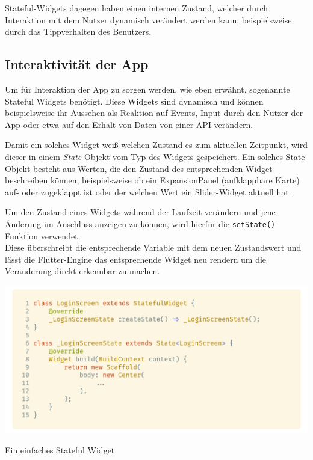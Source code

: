Stateful-Widgets dagegen haben einen internen Zustand, welcher durch Interaktion mit dem Nutzer dynamisch verändert
werden kann, beispielsweise durch das Tippverhalten des Benutzers.

\subsection{Interaktivität der App}


Um für Interaktion der App zu sorgen werden, wie eben erwähnt, sogenannte Stateful Widgets benötigt.
Diese Widgets sind dynamisch und können beispielsweise ihr Aussehen als Reaktion auf Events, Input durch
den Nutzer der App oder etwa auf den Erhalt von Daten von einer API verändern.

Damit ein solches Widget weiß welchen Zustand es zum aktuellen Zeitpunkt, wird dieser in einem \textit{State}-Objekt vom Typ
des Widgets gespeichert. Ein solches State-Objekt besteht aus Werten, die den Zustand des entsprechenden Widget beschreiben können,
beispielsweise ob ein ExpansionPanel (aufklappbare Karte) auf- oder zugeklappt ist oder der welchen Wert ein Slider-Widget
aktuell hat.

Um den Zustand eines Widgets während der Laufzeit verändern und jene Änderung im Anschluss anzeigen zu können,
wird hierfür die \lstinline{setState()}-Funktion verwendet.\\
Diese überschreibt die entsprechende Variable mit dem neuen Zustandswert und lässt die Flutter-Engine das entsprechende
Widget neu rendern um die Veränderung direkt erkennbar zu machen.

\begin{code}
    \centering
    \includegraphics[width=1\textwidth]{images/Flutter/flutterStatefulWidget.png}
    \caption{Ein einfaches Stateful Widget}
\end{code}

